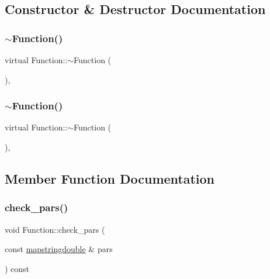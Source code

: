 \subsection{Constructor \& Destructor Documentation}
\mbox{\label{classFunction_a8697b2e490a4314a7ccbb17aea8ce537}} 
\subsubsection{\texorpdfstring{$\sim$Function()}{~Function()}\hspace{0.1cm}{\footnotesize\ttfamily [1/2]}}
{\footnotesize\ttfamily virtual Function\+::$\sim$\+Function (\begin{DoxyParamCaption}{ }\end{DoxyParamCaption})\hspace{0.3cm}{\ttfamily [inline]}, {\ttfamily [virtual]}}

\mbox{\label{classFunction_a8697b2e490a4314a7ccbb17aea8ce537}} 
\subsubsection{\texorpdfstring{$\sim$Function()}{~Function()}\hspace{0.1cm}{\footnotesize\ttfamily [2/2]}}
{\footnotesize\ttfamily virtual Function\+::$\sim$\+Function (\begin{DoxyParamCaption}{ }\end{DoxyParamCaption})\hspace{0.3cm}{\ttfamily [inline]}, {\ttfamily [virtual]}}



\subsection{Member Function Documentation}
\mbox{\label{classFunction_a6f2286114002e574154727a813957175}} 
\subsubsection{\texorpdfstring{check\_pars()}{check\_pars()}\hspace{0.1cm}{\footnotesize\ttfamily [1/2]}}
{\footnotesize\ttfamily void Function\+::check\+\_\+pars (\begin{DoxyParamCaption}\item[{const \mbox{\hyperlink{lib_2fitting__lib_2includes_8h_a647b481c557c7966517f753340a81d13}{mapstringdouble}} \&}]{pars }\end{DoxyParamCaption}) const\hspace{0.3cm}{\ttfamily [inline]}}

